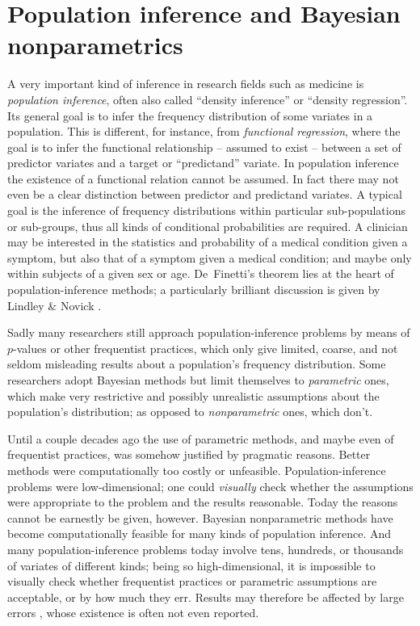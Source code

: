 \documentclass{article}
\begin{document}
\section{Population inference and Bayesian nonparametrics}
\label{sec:popinference}

A very important kind of inference in research fields such as medicine is \emph{population inference}, often also called ``density inference'' or ``density regression''. Its general goal is to infer the frequency distribution of some variates in a population. This is different, for instance, from \emph{functional regression}, where the goal is to infer the functional relationship -- assumed to exist -- between a set of predictor variates and a target or ``predictand'' variate. In population inference the existence of a functional relation cannot be assumed. In fact there may not even be a clear distinction between predictor and predictand variates. A typical goal is the inference of frequency distributions within particular sub-populations or sub-groups, thus all kinds of conditional probabilities are required. A clinician may be interested in the statistics and probability of a medical condition given a symptom, but also that of a symptom given a medical condition; and maybe only within subjects of a given sex or age. De~Finetti's theorem \citep[see e.g.][\S\S\,4.2, 4.3, 4.6]{bernardoetal1994_r2000} lies at the heart of population-inference methods; a particularly brilliant discussion is given by Lindley \& Novick \citeyearpar{lindleyetal1981}.

Sadly many researchers still approach population-inference problems by means of $p$-values or other frequentist practices, which only give limited, coarse, and not seldom misleading results about a population's frequency distribution. Some researchers adopt Bayesian methods but limit themselves to \emph{parametric} ones, which make very restrictive and possibly unrealistic assumptions about the population's distribution; as opposed to \emph{nonparametric} ones, which don't.

Until a couple decades ago the use of parametric methods, and maybe even of frequentist practices, was somehow justified by pragmatic reasons. Better methods were computationally too costly or unfeasible. Population-inference problems were low-dimensional; one could \emph{visually} check whether the assumptions were appropriate to the problem and the results reasonable. Today the reasons cannot be earnestly be given, however. Bayesian nonparametric methods have become computationally feasible for many kinds of population inference. And many population-inference problems today involve tens, hundreds, or thousands of variates of different kinds; being so high-dimensional, it is impossible to visually check whether frequentist practices or parametric assumptions are acceptable, or by how much they err. Results may therefore be affected by large errors \citep{draper1995}, whose existence is often not even reported.
\end{document}
